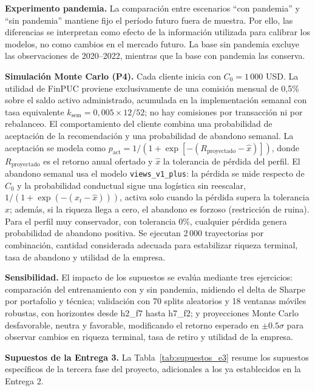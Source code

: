 \textbf{Experimento pandemia.} La comparaci\'on entre escenarios ``con pandemia'' y ``sin pandemia'' mantiene fijo el per\'iodo futuro fuera de muestra. Por ello, las diferencias se interpretan como efecto de la informaci\'on utilizada para calibrar los modelos, no como cambios en el mercado futuro. La base sin pandemia excluye las observaciones de 2020--2022, mientras que la base con pandemia las conserva.

\textbf{Simulaci\'on Monte Carlo (P4).} Cada cliente inicia con $C_0 = 1\,000$ USD. La utilidad de FinPUC proviene exclusivamente de una comisi\'on mensual de 0,5\% sobre el saldo activo administrado, acumulada en la implementaci\'on semanal con tasa equivalente $k_{\text{sem}} = 0{,}005 \times 12/52$; no hay comisiones por transacci\'on ni por rebalanceo. El comportamiento del cliente combina una probabilidad de aceptaci\'on de la recomendaci\'on y una probabilidad de abandono semanal. La aceptaci\'on se modela como $p_{\text{act}}=1/(1+\exp[-(R_{\text{proyectado}}-\hat{x})])$, donde $R_{\text{proyectado}}$ es el retorno anual ofertado y $\hat{x}$ la tolerancia de p\'erdida del perfil. El abandono semanal usa el modelo \texttt{views\_v1\_plus}: la p\'erdida se mide respecto de $C_0$ y la probabilidad conductual sigue una log\'istica sin reescalar, $1/(1+\exp(-(x_t-\hat{x})))$, activa solo cuando la p\'erdida supera la tolerancia $\hat{x}$; adem\'as, si la riqueza llega a cero, el abandono es forzoso (restricci\'on de ruina). Para el perfil muy conservador, con tolerancia 0\%, cualquier p\'erdida genera probabilidad de abandono positiva. Se ejecutan 2\,000 trayectorias por combinaci\'on, cantidad considerada adecuada para estabilizar riqueza terminal, tasa de abandono y utilidad de la empresa.

\textbf{Sensibilidad.} El impacto de los supuestos se eval\'ua mediante tres ejercicios: comparaci\'on del entrenamiento con y sin pandemia, midiendo el delta de Sharpe por portafolio y t\'ecnica; validaci\'on con 70 splits aleatorios y 18 ventanas m\'oviles robustas, con horizontes desde h2\_f7 hasta h7\_f2; y proyecciones Monte Carlo desfavorable, neutra y favorable, modificando el retorno esperado en $\pm 0.5\sigma$ para observar cambios en riqueza terminal, tasa de retiro y utilidad de la empresa.

\textbf{Supuestos de la Entrega 3.}
La Tabla~\ref{tab:supuestos_e3} resume los supuestos espec\'ificos de la tercera fase del proyecto, adicionales a los ya establecidos en la Entrega 2.

